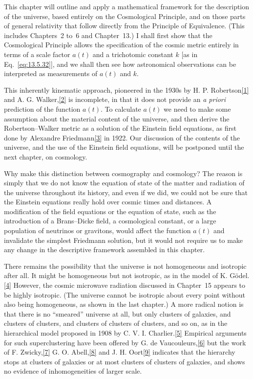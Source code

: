 This chapter will outline and apply a mathematical framework for the
description of the universe, based entirely on the Cosmological Principle, and
on those parts of general relativity that follow directly from the Principle of
Equivalence. (This includes Chapters~2 to~6 and Chapter~13.) I shall first show
that the Cosmological Principle allows the specification of the cosmic metric
entirely in terms of a scale factor \(a(t)\) and a trichotomic constant \(k\)
[as in Eq.~\eqref{eq:13.5.32}], and we shall then see how astronomical
observations can be interpreted as measurements of \(a(t)\) and \(k\).

This inherently kinematic approach, pioneered in the 1930s by H. P.
Robertson\hyperref[ch14-ref-1]{[1]} and A. G.
Walker,\hyperref[ch14-ref-2]{[2]} is incomplete, in that it does not provide an
\emph{a priori} prediction of the function \(a(t)\). To calculate \(a(t)\) we
need to make some assumption about the material content of the universe, and
then derive the Robertson--Walker metric as a solution of the Einstein field
equations, as first done by Alexandre
Friedmann\hyperref[ch14-ref-3]{[3]} in 1922. Our discussion of the contents of
the universe, and the use of the Einstein field equations, will be postponed
until the next chapter, on cosmology.

Why make this distinction between cosmography and cosmology? The reason is
simply that we do not know the equation of state of the matter and radiation of
the universe throughout its history, and even if we did, we could not be sure
that the Einstein equations really hold over cosmic times and distances. A
modification of the field equations or the equation of state, such as the
introduction of a Brans--Dicke field, a cosmological constant, or a large
population of neutrinos or gravitons, would affect the function \(a(t)\) and
invalidate the simplest Friedmann solution, but it would not require us to make
any change in the descriptive framework assembled in this chapter.

There remains the possibility that the universe is not homogeneous and
isotropic after all. It might be homogeneous but not isotropic, as in the model
of K. G\"odel.\hyperref[ch14-ref-4]{[4]} However, the cosmic microwave
radiation discussed in Chapter~15 appears to be highly isotropic. (The universe
cannot be isotropic about every point without also being homogeneous, as shown
in the last chapter.) A more radical notion is that there is no ``smeared''
universe at all, but only clusters of galaxies, and clusters of clusters, and
clusters of clusters of clusters, and so on, as in the hierarchical model
proposed in 1908 by C. V. I.
Charlier.\hyperref[ch14-ref-5]{[5]} Empirical arguments for such
superclustering have been offered by G. de
Vaucouleurs,\hyperref[ch14-ref-6]{[6]} but the work of F.
Zwicky,\hyperref[ch14-ref-7]{[7]} G. O.
Abell,\hyperref[ch14-ref-8]{[8]} and J. H.
Oort\hyperref[ch14-ref-9]{[9]} indicates that the hierarchy stops at clusters
of galaxies or at most clusters of clusters of galaxies, and shows no evidence
of inhomogeneities of larger scale.

